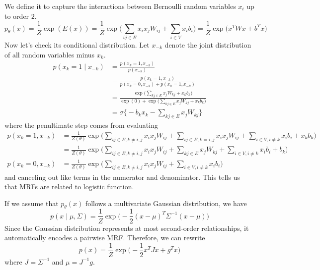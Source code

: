   \begin{example}
    We define it to capture the interactions between Bernoulli random variables $x_i$ up to order $2$. 
    \begin{equation}
      p_{\theta} (x) = \frac{1}{Z} \exp( E(x)) = \frac{1}{Z} \exp \bigg( \sum_{i j \in E} x_i x_j W_{ij} + \sum_{i \in V} x_i b_i \bigg) = \frac{1}{Z} \exp \big( x^T W x + b^T x \big)
    \end{equation}
    Now let's check its conditional distribution. Let $x_{-k}$ denote the joint distribution of all random variables minus $x_k$.  
    \begin{align}
      p(x_k = 1 \mid x_{-k}) & = \frac{p(x_k = 1, x_{-k})}{p(x_{-k})} \\
                             & = \frac{p(x_k = 1, x_{-k})}{p(x_k = 0, x_{-k}) + p(x_k = 1, x_{-k})} \\
                             & = \frac{\exp \Big( \sum_{k j \in E} x_j W_{kj} + x_k b_k \Big)}{\exp(0) + \exp \Big(\sum_{k j \in E} x_j W_{kj} + x_k b_k \Big)} \\
                             & = \sigma \bigg\{ - b_k x_k - \sum_{k j \in E} x_j W_{k j} \bigg\} 
    \end{align}
    where the penultimate step comes from evaluating 
    \begin{align} 
      p(x_k = 1, x_{-k}) & = \frac{1}{Z(\theta)} \exp \bigg( \sum_{ij \in E, k \neq i, j} x_i x_j W_{ij} + \sum_{i j \in E, k = i, j} x_i x_j W_{ij} + \sum_{i \in V, i \neq k} x_i b_i + x_k b_k \bigg) \\
                         & =\frac{1}{Z(\theta)} \exp \bigg( \sum_{ij \in E, k \neq i, j} x_i x_j W_{ij} + \sum_{k j \in E} x_j W_{kj} + \sum_{i \in V, i \neq k} x_i b_i + b_k \bigg)  \\ 
      p(x_k = 0, x_{-k}) & = \frac{1}{Z(\theta)} \exp \bigg( \sum_{ij \in E, k \neq i, j} x_i x_j W_{ij} + \sum_{i \in V, i \neq k} x_i b_i\bigg)  
    \end{align}
    and canceling out like terms in the numerator and denominator. This tells us that MRFs are related to logistic function.  
  \end{example}

  \begin{example} 
    If we assume that $p_{\theta} (x)$ follows a multivariate Gaussian distribution, we have 
    \begin{equation}
      p(x \mid \mu, \Sigma) = \frac{1}{Z} \exp \bigg( -\frac{1}{2} (x - \mu)^T \Sigma^{-1} (x - \mu) \bigg)
    \end{equation}
    Since the Gaussian distribution represents at most second-order relationships, it automatically encodes a pairwise MRF. Therefore, we can rewrite 
    \begin{equation}
      p(x) = \frac{1}{Z} \exp \bigg( -\frac{1}{2} x^T Jx + g^T x \bigg)
    \end{equation}
    where $J = \Sigma^{-1}$ and $\mu = J^{-1} g$. 
  \end{example}

